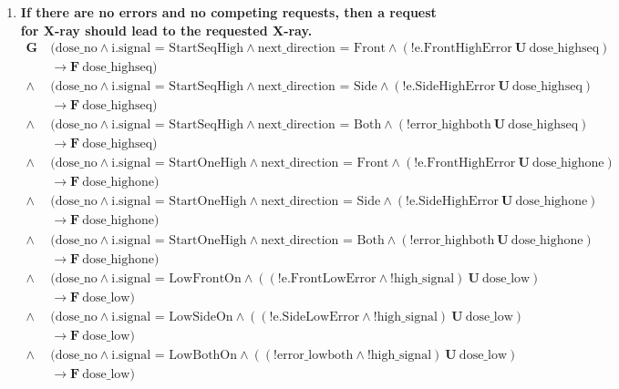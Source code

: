 \documentclass[a4paper,10pt]{article}
\newcommand{\LTLG}{\mathbf{G~}}
\newcommand{\LTLF}{\mathbf{F~}}
\newcommand{\LTLU}{\mathbf{~U~}}
\newcommand{\imply}{\rightarrow}
\newcommand{\doselow}{\textrm{dose\_low}}
\newcommand{\doseno}{\textrm{dose\_no}}
\newcommand{\dosehighseq}{\textrm{dose\_highseq}}
\newcommand{\dosehighone}{\textrm{dose\_highone}}
\newcommand{\highsignal}{\textrm{high\_signal}}
\begin{document}
\begin{enumerate}
		\item \textbf{If there are no errors and no competing requests, then a request for X-ray should lead to the requested X-ray.}
			\begin{align*}
				\LTLG & (\doseno \land \textrm{i.signal = StartSeqHigh} \land \textrm{next\_direction = Front} \land (!\textrm{e.FrontHighError} \LTLU \dosehighseq) \\
					& \imply \LTLF \dosehighseq) \\
				\land & (\doseno \land \textrm{i.signal = StartSeqHigh} \land \textrm{next\_direction = Side} \land (!\textrm{e.SideHighError} \LTLU \dosehighseq) \\
					& \imply \LTLF \dosehighseq) \\
				\land & (\doseno \land \textrm{i.signal = StartSeqHigh} \land \textrm{next\_direction = Both} \land (!\textrm{error\_highboth} \LTLU \dosehighseq) \\
					& \imply \LTLF \dosehighseq) \\
				\land & (\doseno \land \textrm{i.signal = StartOneHigh} \land \textrm{next\_direction = Front} \land (!\textrm{e.FrontHighError} \LTLU \dosehighone) \\
					& \imply \LTLF \dosehighone) \\
				\land & (\doseno \land \textrm{i.signal = StartOneHigh} \land \textrm{next\_direction = Side} \land (!\textrm{e.SideHighError} \LTLU \dosehighone) \\
					& \imply \LTLF \dosehighone) \\
				\land & (\doseno \land \textrm{i.signal = StartOneHigh} \land \textrm{next\_direction = Both} \land (!\textrm{error\_highboth} \LTLU \dosehighone) \\
					& \imply \LTLF \dosehighone) \\
				\land & (\doseno \land \textrm{i.signal = LowFrontOn} \land ((!\textrm{e.FrontLowError} \land !\highsignal) \LTLU \doselow) \\
					& \imply \LTLF \doselow) \\
				\land & (\doseno \land \textrm{i.signal = LowSideOn} \land ((!\textrm{e.SideLowError} \land !\highsignal) \LTLU \doselow) \\
					& \imply \LTLF \doselow) \\
				\land & (\doseno \land \textrm{i.signal = LowBothOn} \land ((!\textrm{error\_lowboth} \land !\highsignal) \LTLU \doselow) \\
					& \imply \LTLF \doselow)
			\end{align*}


\end{enumerate}
\end{document}
